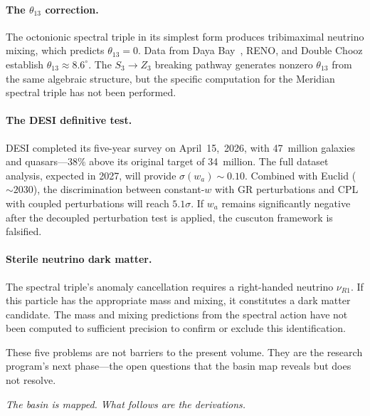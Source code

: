 \paragraph{The $\theta_{13}$ correction.}
The octonionic spectral triple in its simplest form produces
tribimaximal neutrino mixing, which predicts $\theta_{13} = 0$. Data
from Daya Bay~\cite{ch4:DayaBay2012}, RENO, and Double Chooz
establish $\theta_{13} \approx 8.6^\circ$. The $S_3 \to Z_3$ breaking
pathway generates nonzero $\theta_{13}$ from the same algebraic
structure, but the specific computation for the Meridian spectral
triple has not been performed.

\paragraph{The DESI definitive test.}
DESI completed its five-year survey on April~15,~2026, with 47~million
galaxies and quasars---$38\%$ above its original target of 34~million.
The full dataset analysis, expected in 2027, will provide
$\sigma(w_a) \sim 0.10$. Combined with Euclid ($\sim\!2030$), the
discrimination between constant-$w$ with GR perturbations and CPL with
coupled perturbations will reach $5.1\sigma$. If $w_a$ remains
significantly negative after the decoupled perturbation test is
applied, the cuscuton framework is falsified.

\paragraph{Sterile neutrino dark matter.}
The spectral triple's anomaly cancellation requires a right-handed
neutrino $\nu_{R1}$. If this particle has the appropriate mass and
mixing, it constitutes a dark matter candidate. The mass and mixing
predictions from the spectral action have not been computed to
sufficient precision to confirm or exclude this identification.

These five problems are not barriers to the present volume. They are
the research program's next phase---the open questions that the basin
map reveals but does not resolve.

\bigskip
\begin{center}
\itshape The basin is mapped. What follows are the derivations.
\end{center}
